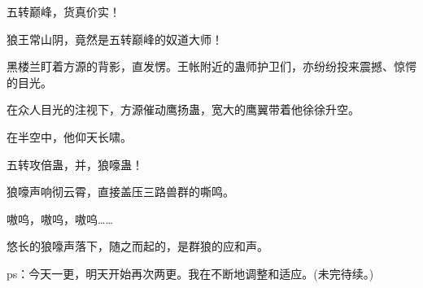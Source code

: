 \begin{this_body}
五转巅峰，货真价实！

狼王常山阴，竟然是五转巅峰的奴道大师！

黑楼兰盯着方源的背影，直发愣。王帐附近的蛊师护卫们，亦纷纷投来震撼、惊愕的目光。

在众人目光的注视下，方源催动鹰扬蛊，宽大的鹰翼带着他徐徐升空。

在半空中，他仰天长啸。

五转攻倍蛊，并，狼嚎蛊！

狼嚎声响彻云霄，直接盖压三路兽群的嘶鸣。

嗷呜，嗷呜，嗷呜……

悠长的狼嚎声落下，随之而起的，是群狼的应和声。

ps：今天一更，明天开始再次两更。我在不断地调整和适应。(未完待续。)

\end{this_body}


